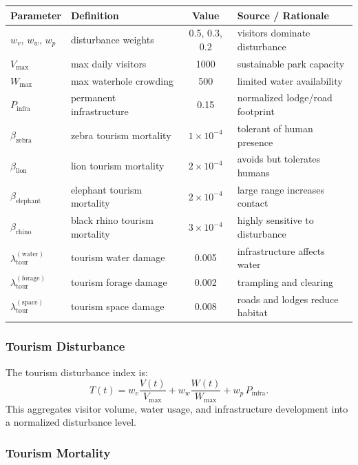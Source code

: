 \begin{center}
\begin{tabular}{l l c l}
\hline
\textbf{Parameter} & \textbf{Definition} & \textbf{Value} & \textbf{Source / Rationale} \\
\hline
$w_v,\,w_w,\,w_p$ & disturbance weights & 0.5, 0.3, 0.2 & visitors dominate disturbance \\
$V_{\max}$ & max daily visitors & 1000 & sustainable park capacity \\
$W_{\max}$ & max waterhole crowding & 500 & limited water availability \\
$P_{\text{infra}}$ & permanent infrastructure & 0.15 & normalized lodge/road footprint \\
$\beta_{\text{zebra}}$ & zebra tourism mortality & $1 \times 10^{-4}$ & tolerant of human presence \cite{gaillard2000dynamics} \\
$\beta_{\text{lion}}$ & lion tourism mortality & $2 \times 10^{-4}$ & avoids but tolerates humans \cite{trinkel2013lions} \\
$\beta_{\text{elephant}}$ & elephant tourism mortality & $2 \times 10^{-4}$ & large range increases contact \cite{calef1988elephant} \\
$\beta_{\text{rhino}}$ & black rhino tourism mortality & $3 \times 10^{-4}$ & highly sensitive to disturbance \cite{emslie1999rhino} \\
$\lambda_{\text{tour}}^{(\text{water})}$ & tourism water damage & 0.005 & infrastructure affects water \\
$\lambda_{\text{tour}}^{(\text{forage})}$ & tourism forage damage & 0.002 & trampling and clearing \\
$\lambda_{\text{tour}}^{(\text{space})}$ & tourism space damage & 0.008 & roads and lodges reduce habitat \\
\hline
\end{tabular}
\end{center}

\subsubsection{Tourism Disturbance}

The tourism disturbance index is:
\[
T(t) = w_v\frac{V(t)}{V_{\max}} + w_w\frac{W(t)}{W_{\max}} + w_p\, P_{\text{infra}}.
\]
This aggregates visitor volume, water usage, and infrastructure development into a normalized disturbance level.

\subsubsection{Tourism Mortality}


